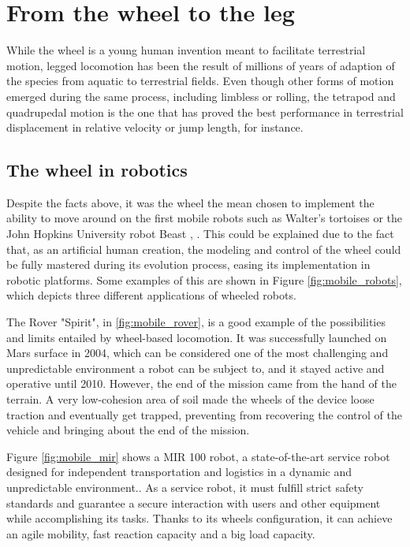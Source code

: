 
\section{From the wheel to the leg} %
\label{sec:from_the_wheel_to_the_leg}
While the wheel is a young human invention meant to facilitate terrestrial motion, legged locomotion has been the result of millions of years of adaption of the species from aquatic to terrestrial fields.
Even though other forms of motion emerged during the same process, including limbless or rolling, the tetrapod and quadrupedal motion is the one that has proved the best performance in terrestrial displacement in relative velocity or jump length, for instance.

\subsection{The wheel in robotics} %
\label{sub:the_wheel_in_robotics}
Despite the facts above, it was the wheel the mean chosen to implement the ability to move around on the first mobile robots such as Walter's tortoises or the John Hopkins University robot Beast \cite{first_mobile_robot}, \cite{second_mobile_robot}.
This could be explained due to the fact that, as an artificial human creation, the modeling and control of the wheel could be fully mastered during its evolution process, easing its implementation in robotic platforms.
Some examples of this are shown in Figure \ref{fig:mobile_robots}, which depicts three different applications of wheeled robots.

The Rover "Spirit", in \ref{fig:mobile_rover}, is a good example of the possibilities and limits entailed by wheel-based locomotion.
It was successfully launched on Mars surface in 2004, which can be considered one of the most challenging and unpredictable environment a robot can be subject to, and it stayed active and operative until 2010.
However, the end of the mission came from the hand of the terrain. 
A very low-cohesion area of soil made the wheels of the device loose traction and eventually get trapped, preventing from recovering the control of the vehicle and bringing about the end of the mission.

Figure \ref{fig:mobile_mir} shows a MIR 100 robot, a state-of-the-art service robot designed for independent transportation and logistics in a dynamic and unpredictable environment..
As a service robot, it must fulfill strict safety standards and guarantee a secure interaction with users and other equipment while accomplishing its tasks.
Thanks to its wheels configuration, it can achieve an agile mobility, fast reaction capacity and a big load capacity.

